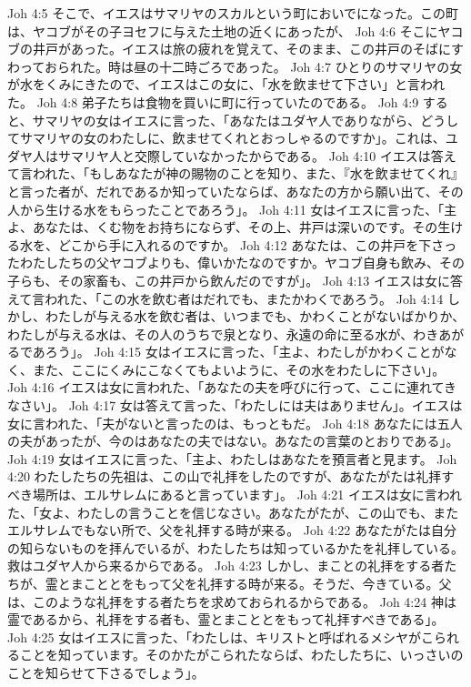 Joh 4:5  そこで、イエスはサマリヤのスカルという町においでになった。この町は、ヤコブがその子ヨセフに与えた土地の近くにあったが、
Joh 4:6  そこにヤコブの井戸があった。イエスは旅の疲れを覚えて、そのまま、この井戸のそばにすわっておられた。時は昼の十二時ごろであった。
Joh 4:7  ひとりのサマリヤの女が水をくみにきたので、イエスはこの女に、「水を飲ませて下さい」と言われた。
Joh 4:8  弟子たちは食物を買いに町に行っていたのである。
Joh 4:9  すると、サマリヤの女はイエスに言った、「あなたはユダヤ人でありながら、どうしてサマリヤの女のわたしに、飲ませてくれとおっしゃるのですか」。これは、ユダヤ人はサマリヤ人と交際していなかったからである。
Joh 4:10  イエスは答えて言われた、「もしあなたが神の賜物のことを知り、また、『水を飲ませてくれ』と言った者が、だれであるか知っていたならば、あなたの方から願い出て、その人から生ける水をもらったことであろう」。
Joh 4:11  女はイエスに言った、「主よ、あなたは、くむ物をお持ちにならず、その上、井戸は深いのです。その生ける水を、どこから手に入れるのですか。
Joh 4:12  あなたは、この井戸を下さったわたしたちの父ヤコブよりも、偉いかたなのですか。ヤコブ自身も飲み、その子らも、その家畜も、この井戸から飲んだのですが」。
Joh 4:13  イエスは女に答えて言われた、「この水を飲む者はだれでも、またかわくであろう。
Joh 4:14  しかし、わたしが与える水を飲む者は、いつまでも、かわくことがないばかりか、わたしが与える水は、その人のうちで泉となり、永遠の命に至る水が、わきあがるであろう」。
Joh 4:15  女はイエスに言った、「主よ、わたしがかわくことがなく、また、ここにくみにこなくてもよいように、その水をわたしに下さい」。
Joh 4:16  イエスは女に言われた、「あなたの夫を呼びに行って、ここに連れてきなさい」。
Joh 4:17  女は答えて言った、「わたしには夫はありません」。イエスは女に言われた、「夫がないと言ったのは、もっともだ。
Joh 4:18  あなたには五人の夫があったが、今のはあなたの夫ではない。あなたの言葉のとおりである」。
Joh 4:19  女はイエスに言った、「主よ、わたしはあなたを預言者と見ます。
Joh 4:20  わたしたちの先祖は、この山で礼拝をしたのですが、あなたがたは礼拝すべき場所は、エルサレムにあると言っています」。
Joh 4:21  イエスは女に言われた、「女よ、わたしの言うことを信じなさい。あなたがたが、この山でも、またエルサレムでもない所で、父を礼拝する時が来る。
Joh 4:22  あなたがたは自分の知らないものを拝んでいるが、わたしたちは知っているかたを礼拝している。救はユダヤ人から来るからである。
Joh 4:23  しかし、まことの礼拝をする者たちが、霊とまこととをもって父を礼拝する時が来る。そうだ、今きている。父は、このような礼拝をする者たちを求めておられるからである。
Joh 4:24  神は霊であるから、礼拝をする者も、霊とまこととをもって礼拝すべきである」。
Joh 4:25  女はイエスに言った、「わたしは、キリストと呼ばれるメシヤがこられることを知っています。そのかたがこられたならば、わたしたちに、いっさいのことを知らせて下さるでしょう」。
